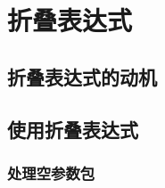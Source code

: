 \section{折叠表达式}\label{ch11}
\subsection{折叠表达式的动机}
\subsection{使用折叠表达式}
\subsubsection{处理空参数包}\label{ch11.2.1}